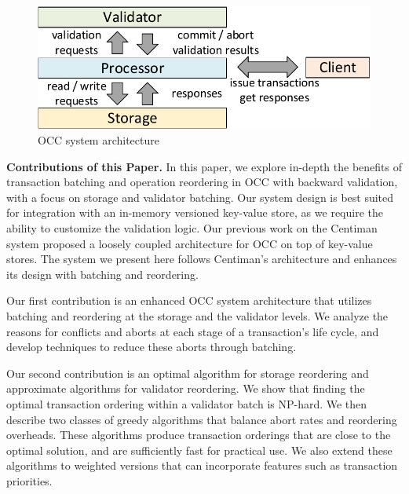 
\begin{figure}[t]
 \centering
 \includegraphics[width=0.9\columnwidth]{figures/arch.pdf}
 \vspace{-.5em}
 \caption{OCC system architecture}
 \vspace{-1em}
 \label{fig:occ_arch}
\end{figure}


{\bf Contributions of this Paper.}
In this paper, we explore in-depth the benefits of transaction batching and operation reordering in OCC with backward validation, with a focus on storage and validator batching. Our system design is best suited for integration with an in-memory versioned key-value store, as we require the ability to customize the validation logic. Our previous work on the Centiman system\cite{ding2015centiman} proposed a loosely coupled architecture for OCC on top of key-value stores. The system we present here follows Centiman's architecture and enhances its design with batching and reordering.

Our first contribution is an enhanced OCC system architecture that utilizes batching and reordering at the storage and the validator levels. We analyze the reasons for conflicts and aborts at each stage of a transaction's life cycle, and develop techniques to reduce these aborts through batching.


Our second contribution is an optimal algorithm for storage reordering and
approximate algorithms for validator reordering. We show that finding the
optimal transaction ordering within a validator batch is NP-hard. We then describe
two classes of greedy algorithms that balance abort rates and reordering overheads. These algorithms produce transaction orderings
that are close to the optimal solution, and are sufficiently fast for
practical use. We also extend these algorithms to weighted versions that can incorporate features such as transaction priorities.


